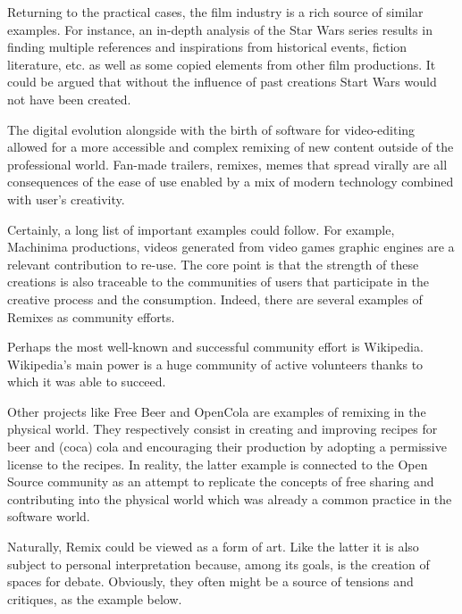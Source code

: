 Returning to the practical cases, the film industry is a rich source of similar examples. For instance, an in-depth analysis of the Star Wars series results in finding multiple references and inspirations from historical events, fiction literature, etc. as well as some copied elements from other film productions. It could be argued that without the influence of past creations Start Wars would not have been created.

The digital evolution alongside with the birth of software for video-editing allowed for a more accessible and complex remixing of new content outside of the professional world. Fan-made trailers, remixes, memes that spread virally are all consequences of the ease of use enabled by a mix of modern technology combined with user’s creativity.

Certainly, a long list of important examples could follow. For example, Machinima productions, videos generated from video games graphic engines are a relevant contribution to re-use.
The core point is that the strength of these creations is also traceable to the communities of users that participate in the creative process and the consumption. Indeed, there are several examples of Remixes as community efforts.

Perhaps the most well-known and successful community effort is Wikipedia. Wikipedia’s main power is a huge community of active volunteers thanks to which it was able to succeed.

Other projects like Free Beer and OpenCola are examples of remixing in the physical world. They respectively consist in creating and improving recipes for beer and (coca) cola and encouraging their production by adopting a permissive license to the recipes.
In reality, the latter example is connected to the Open Source community as an attempt to replicate the concepts of free sharing and contributing into the physical world which was already a common practice in the software world. 

Naturally, Remix could be viewed as a form of art. Like the latter it is also subject to personal interpretation because, among its goals, is the creation of spaces for debate. Obviously, they often might be a source of tensions and critiques, as the example below.


